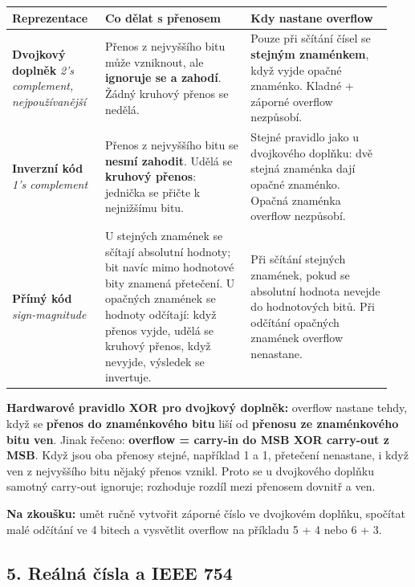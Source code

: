 \documentclass[11pt,a4paper]{article}
\newcommand{\itzk}[1]{\medskip\noindent\colorbox{blue!7}{\parbox{\dimexpr\linewidth-2\fboxsep}{#1}}\medskip}
\newcommand{\itpr}[1]{\medskip\noindent\colorbox{green!8}{\parbox{\dimexpr\linewidth-2\fboxsep}{#1}}\medskip}
\begin{document}
\begin{longtable}{p{0.23\linewidth}p{0.36\linewidth}p{0.35\linewidth}}
\toprule
\textbf{Reprezentace} & \textbf{Co dělat s přenosem} & \textbf{Kdy nastane overflow} \\
\midrule\endhead
\textbf{Dvojkový doplněk} \newline \emph{2's complement, nejpoužívanější}
& Přenos z nejvyššího bitu může vzniknout, ale \textbf{ignoruje se a zahodí}. Žádný kruhový přenos se nedělá.
& Pouze při sčítání čísel se \textbf{stejným znaménkem}, když vyjde opačné znaménko. Kladné + záporné overflow nezpůsobí. \\
\addlinespace
\textbf{Inverzní kód} \newline \emph{1's complement}
& Přenos z nejvyššího bitu se \textbf{nesmí zahodit}. Udělá se \textbf{kruhový přenos}: jednička se přičte k nejnižšímu bitu.
& Stejné pravidlo jako u dvojkového doplňku: dvě stejná znaménka dají opačné znaménko. Opačná znaménka overflow nezpůsobí. \\
\addlinespace
\textbf{Přímý kód} \newline \emph{sign-magnitude}
& U stejných znamének se sčítají absolutní hodnoty; bit navíc mimo hodnotové bity znamená přetečení. U opačných znamének se hodnoty odčítají: když přenos vyjde, udělá se kruhový přenos, když nevyjde, výsledek se invertuje.
& Při sčítání stejných znamének, pokud se absolutní hodnota nevejde do hodnotových bitů. Při odčítání opačných znamének overflow nenastane. \\
\bottomrule
\end{longtable}

\itpr{\textbf{Hardwarové pravidlo XOR pro dvojkový doplněk:} overflow nastane tehdy, když se \textbf{přenos do znaménkového bitu} liší od \textbf{přenosu ze znaménkového bitu ven}. Jinak řečeno: \textbf{overflow = carry-in do MSB XOR carry-out z MSB}. Když jsou oba přenosy stejné, například 1 a 1, přetečení nenastane, i když ven z nejvyššího bitu nějaký přenos vznikl. Proto se u dvojkového doplňku samotný carry-out ignoruje; rozhoduje rozdíl mezi přenosem dovnitř a ven.}

\itzk{\textbf{Na zkoušku:} umět ručně vytvořit záporné číslo ve dvojkovém doplňku, spočítat malé odčítání ve 4 bitech a vysvětlit overflow na příkladu 5 + 4 nebo 6 + 3.}

\subsection*{5. Reálná čísla a IEEE 754}
\end{document}
